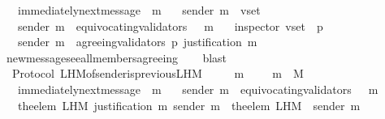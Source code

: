 \begin{isabellebody}
\ \ {\isasymlongrightarrow}\ immediately{\isacharunderscore}next{\isacharunderscore}message\ {\isacharparenleft}{\isasymsigma}{\isacharcomma}\ m{\isacharparenright}\isanewline
\ \ {\isasymlongrightarrow}\ sender\ m\ {\isasymin}\ v{\isacharunderscore}set\isanewline
\ \ {\isasymlongrightarrow}\ sender\ m\ {\isasymnotin}\ equivocating{\isacharunderscore}validators\ {\isacharparenleft}{\isasymsigma}\ {\isasymunion}\ {\isacharbraceleft}m{\isacharbraceright}{\isacharparenright}\isanewline
\ \ {\isasymlongrightarrow}\ inspector\ {\isacharparenleft}v{\isacharunderscore}set{\isacharcomma}\ {\isasymsigma}{\isacharcomma}\ p{\isacharparenright}\ \isanewline
\ \ {\isasymlongrightarrow}\ sender\ m\ {\isasymin}\ agreeing{\isacharunderscore}validators\ {\isacharparenleft}p{\isacharcomma}\ justification\ m{\isacharparenright}{\isachardoublequoteclose}\isanewline
%
\isadelimproof
\ \ %
\endisadelimproof
%
\isatagproof
{}\isamarkupfalse%
\ new{\isacharunderscore}message{\isacharunderscore}see{\isacharunderscore}all{\isacharunderscore}members{\isacharunderscore}agreeing\isanewline
\ \ \isamarkupfalse%
\ blast%
\endisatagproof
{\isafoldproof}%
%
\isadelimproof
\ \isanewline
%
\endisadelimproof
\isanewline
\isanewline
\isanewline
\isanewline
{}\isamarkupfalse%
\ {\isacharparenleft}\ Protocol{\isacharparenright}\ L{\isacharunderscore}H{\isacharunderscore}M{\isacharunderscore}of{\isacharunderscore}sender{\isacharunderscore}is{\isacharunderscore}previous{\isacharunderscore}L{\isacharunderscore}H{\isacharunderscore}M\ {\isacharcolon}\isanewline
\ \ {\isachardoublequoteopen}{\isasymforall}\ {\isasymsigma}\ m{\isachardot}\ {\isasymsigma}\ {\isasymin}\ {\isasymSigma}\ {\isasymand}\ m\ {\isasymin}\ M\ \isanewline
\ \ {\isasymlongrightarrow}\ immediately{\isacharunderscore}next{\isacharunderscore}message\ {\isacharparenleft}{\isasymsigma}{\isacharcomma}\ m{\isacharparenright}\isanewline
\ \ {\isasymlongrightarrow}\ sender\ m\ {\isasymnotin}\ equivocating{\isacharunderscore}validators\ {\isacharparenleft}{\isasymsigma}\ {\isasymunion}\ {\isacharbraceleft}m{\isacharbraceright}{\isacharparenright}\isanewline
\ \ {\isasymlongrightarrow}\ the{\isacharunderscore}elem\ {\isacharparenleft}L{\isacharunderscore}H{\isacharunderscore}M\ {\isacharparenleft}justification\ m{\isacharparenright}\ {\isacharparenleft}sender\ m{\isacharparenright}{\isacharparenright}\ {\isacharequal}\ the{\isacharunderscore}elem\ {\isacharparenleft}L{\isacharunderscore}H{\isacharunderscore}M\ {\isasymsigma}\ {\isacharparenleft}sender\ m{\isacharparenright}{\isacharparenright}{\isachardoublequoteclose}\isanewline

\end{isabellebody}
